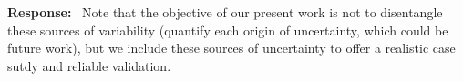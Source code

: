 \documentclass[11pt]{article}
\newenvironment{response}{\par\smallskip\noindent\color{resp}\textbf{Response:}\ }{\par}
\newcommand{\m}{\mathbf{m}}
\newcommand{\z}{\mathbf{z}}
\begin{document}
\begin{response}
Note that the objective of our present work is not to disentangle these sources of variability (quantify each origin of uncertainty, which could be future work), but we include these sources of uncertainty to offer a realistic case sutdy and reliable validation. 
%
%	
%
%
%

\end{response}
\end{document}
